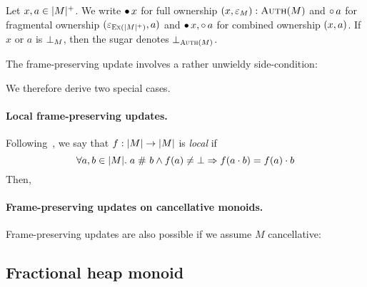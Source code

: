 Let $x, \melt \in \mcarp M$.
We write $\authfull x$ for full ownership $(x, \munit_M):\auth{M}$ and $\authfrag \melt$ for fragmental ownership $(\munit_{\exm{\mcarp{M}}}, \melt)$ and $\authfull x , \authfrag \melt$ for combined ownership $(x, \melt)$.
If $x$ or $a$ is $\mzero_{M}$, then the sugar denotes $\mzero_{\auth{M}}$.

The frame-preserving update involves a rather unwieldy side-condition:
\begin{mathpar}
\end{mathpar}
We therefore derive two special cases.

\paragraph{Local frame-preserving updates.}

\newcommand\authupd{f}%
Following~\cite{scsl}, we say that $\authupd: \mcar{M} \ra \mcar{M}$ is \emph{local} if
\[
	\All a, b \in \mcar{M}. a \sep b \land \authupd(a) \neq \mzero \Ra \authupd(a \mtimes b) = \authupd(a) \mtimes b
\]
Then,

\paragraph{Frame-preserving updates on cancellative monoids.}

Frame-preserving updates are also possible if we assume $M$ cancellative:

\subsection{Fractional heap monoid}
\label{sec:fheapm}

